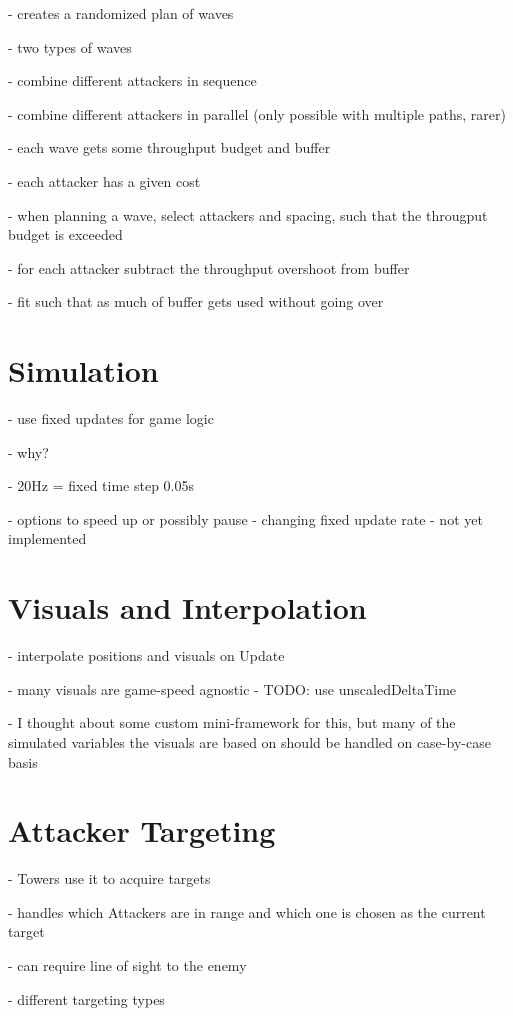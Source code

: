 - creates a randomized plan of waves

- two types of waves

- combine different attackers in sequence

- combine different attackers in parallel (only possible with multiple paths, rarer)

- each wave gets some throughput budget and buffer

- each attacker has a given cost

- when planning a wave, select attackers and spacing, such that the througput budget is exceeded

- for each attacker subtract the throughput overshoot from buffer

- fit such that as much of buffer gets used without going over

\section{Simulation}

- use fixed updates for game logic

- why?

- 20Hz = fixed time step 0.05s

- options to speed up or possibly pause - changing fixed update rate - not yet implemented

\section{Visuals and Interpolation}

- interpolate positions and visuals on Update

- many visuals are game-speed agnostic     - TODO: use unscaledDeltaTime

- I thought about some custom mini-framework for this, but many of the simulated variables the visuals are based on should be handled on case-by-case basis

\section{Attacker Targeting}

- Towers use it to acquire targets

- handles which Attackers are in range and which one is chosen as the current target

- can require line of sight to the enemy

- different targeting types

